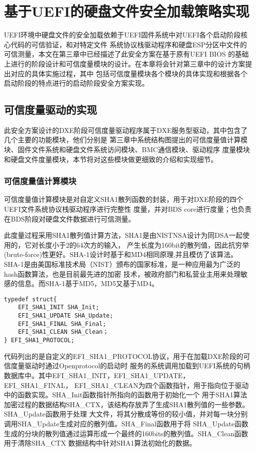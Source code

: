 %
%
\chapter{基于UEFI的硬盘文件安全加载策略实现}
\label{cha:detail_design}
UEFI环境中硬盘文件的安全加载依赖于UEFI固件系统中对UEFI各个启动阶段核心代码的可信验证，和对特定文件
系统协议栈驱动程序和硬盘ESP分区中文件的可信测量，本文在第三章中已经描述了此安全方案在基于原有UEFI BIOS
的基础上进行的阶段设计和可信度量模块的设计。在本章将会针对第三章中的设计方案提出对应的具体实施过程，其中
包括可信度量模块各个模块的具体实现和根据各个启动阶段的特点进行的启动阶段安全方案实现。

%
%
\section{可信度量驱动的实现}
此安全方案设计的DXE阶段可信度量驱动程序属于DXE服务型驱动，其中包含了几个主要的功能模块，他们分别是
第三章中系统结构图提出的可信度量值计算模块、固件文件系统和硬盘文件系统访问模块、BMC通信模块、驱动程序
度量模块和硬盘文件度量模块，本节将对这些模块做更细致的介绍和实现细节。

\subsection{可信度量值计算模块}
可信度量值计算模块是对自定义SHA1散列函数的封装，用于对DXE阶段的四个UEFI文件系统协议栈驱动程序进行完整性
度量，并对BDS core进行度量；也负责在BDS阶段对硬盘文件数据进行可信测量。
\par 此度量过程采用SHA1散列值计算方法，SHA1是由NISTNSA设计为同DSA一起使用的，它对长度小于2的64次方的输入，
产生长度为160bit的散列值，因此抗穷举(brute-force)性更好。SHA-1设计时基于和MD4相同原理,并且模仿了该算法。
SHA-1是由美国标准技术局（NIST）颁布的国家标准，是一种应用最为广泛的hash函数算法，也是目前最先进的加密
技术，被政府部门和私营业主用来处理敏感的信息。而SHA-1基于MD5，MD5又基于MD4。

\begin{lstlisting}
typedef struct{
    EFI_SHA1_INIT SHA_Init;
    EFI_SHA1_UPDATE SHA_Update;
    EFI_SHA1_FINAL SHA_Final;
    EFI_SHA1_CLEAN SHA_Clean；
} EFI_SHA1_PROTOCOL;
\end{lstlisting}

代码列出的是自定义的EFI\_SHA1\_PROTOCOL协议，用于在加载DXE阶段的可信度量驱动时通过Openprotocol的启动时
服务的系统调用加载到UEFI系统的句柄数据库中。其中EFI\_SHA1\_INIT，EFI\_SHA1\_UPDATE，EFI\_SHA1\_FINAL，
EFI\_SHA1\_CLEAN为四个函数指针，用于指向位于驱动中的函数实现。SHA\_Init函数指针所指向的函数用于初始化一个
用于SHA1算法加密过程的数据结构SHA\_CTX，该结构存放弄了生成SHA1散列值的一些参数。SHA\_Update函数用于处理
大文件，将其分散成等份的较小值，并对每一块分别调用SHA\_Update生成对应的散列值。SHA\_Final函数用于将
SHA\_Update函数生成的分块的散列值通过运算形成一个最终的160bits的散列值。SHA\_Clean函数用于清除SHA\_CTX
数据结构中针对SHA1算法初始化的数据。

